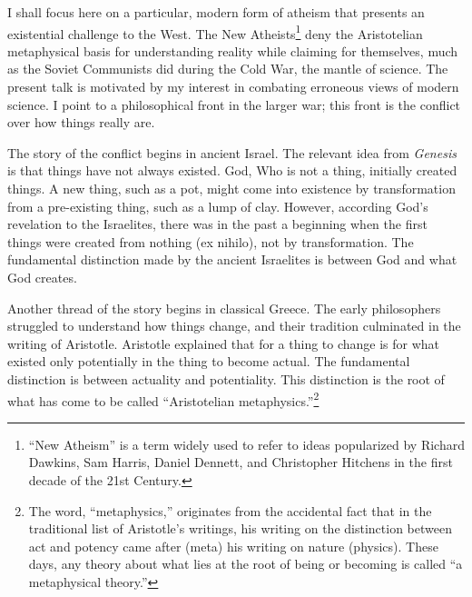 \documentclass[twocolumn]{article}
\begin{document}
I shall focus here on a particular, modern form of atheism that presents an
existential challenge to the West.  The New Atheists\footnote{%
   ``New Atheism'' is a term widely used to refer to ideas popularized by
   Richard Dawkins, Sam Harris, Daniel Dennett, and Christopher Hitchens in the
   first decade of the 21st Century.
}
deny the Aristotelian metaphysical basis for understanding reality while
claiming for themselves, much as the Soviet Communists did during the Cold War,
the mantle of science.  The present talk is motivated by my interest in
combating erroneous views of modern science.  I point to a philosophical front
in the larger war; this front is the conflict over how things really are.

The story of the conflict begins in ancient Israel.  The relevant idea from
{\it Genesis} is that things have not always existed.  God, Who is not a thing,
initially created things.  A new thing, such as a pot, might come into
existence by transformation from a pre-existing thing, such as a lump of clay.
However, according God's revelation to the Israelites, there was in the past a
beginning when the first things were created from nothing (ex nihilo), not by
transformation.  The fundamental distinction made by the ancient Israelites is
between God and what God creates.

Another thread of the story begins in classical Greece.  The early philosophers
struggled to understand how things change, and their tradition culminated in
the writing of Aristotle.  Aristotle explained that for a thing to change is
for what existed only potentially in the thing to become actual.  The
fundamental distinction is between actuality and potentiality.  This
distinction is the root of what has come to be called ``Aristotelian
metaphysics.''\footnote{%
   The word, ``metaphysics,'' originates from the accidental fact that in the
   traditional list of Aristotle's writings, his writing on the distinction
   between act and potency came after (meta) his writing on nature (physics).
   These days, any theory about what lies at the root of being or becoming is
   called ``a metaphysical theory.''%
}
\end{document}
